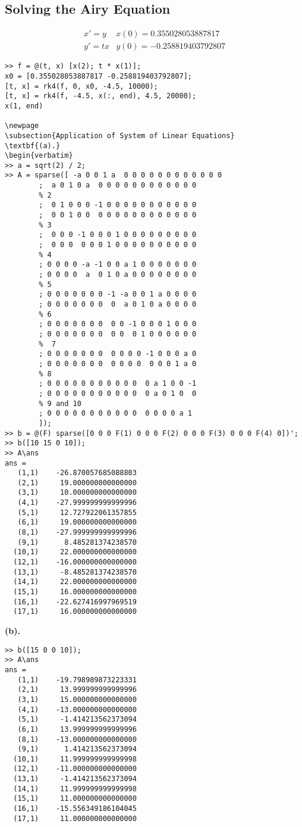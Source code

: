 \subsection{Solving the Airy Equation}
\[\begin{array}{cc}
    x'=y & x(0)=0.355028053887817 \\
    y'=tx & y(0)=-0.258819403792807
\end{array}\]
\begin{verbatim}
>> f = @(t, x) [x(2); t * x(1)];
x0 = [0.355028053887817 -0.258819403792807];
[t, x] = rk4(f, 0, x0, -4.5, 10000);
[t, x] = rk4(f, -4.5, x(:, end), 4.5, 20000);
x(1, end)

\newpage
\subsection{Application of System of Linear Equations}
\textbf{(a).}
\begin{verbatim}
>> a = sqrt(2) / 2;
>> A = sparse([ -a 0 0 1 a  0 0 0 0 0 0 0 0 0 0 0 0
        ;  a 0 1 0 a  0 0 0 0 0 0 0 0 0 0 0 0
        % 2
        ;  0 1 0 0 0 -1 0 0 0 0 0 0 0 0 0 0 0
        ;  0 0 1 0 0  0 0 0 0 0 0 0 0 0 0 0 0
        % 3
        ;  0 0 0 -1 0 0 0 1 0 0 0 0 0 0 0 0 0
        ;  0 0 0  0 0 0 1 0 0 0 0 0 0 0 0 0 0
        % 4
        ; 0 0 0 0 -a -1 0 0 a 1 0 0 0 0 0 0 0
        ; 0 0 0 0  a  0 1 0 a 0 0 0 0 0 0 0 0 
        % 5
        ; 0 0 0 0 0 0 0 -1 -a 0 0 1 a 0 0 0 0
        ; 0 0 0 0 0 0 0  0  a 0 1 0 a 0 0 0 0
        % 6
        ; 0 0 0 0 0 0 0  0 0 -1 0 0 0 1 0 0 0
        ; 0 0 0 0 0 0 0  0 0  0 1 0 0 0 0 0 0
        %  7
        ; 0 0 0 0 0 0 0  0 0 0 0 -1 0 0 0 a 0
        ; 0 0 0 0 0 0 0  0 0 0 0  0 0 0 1 a 0
        % 8
        ; 0 0 0 0 0 0 0 0 0 0 0  0 a 1 0 0 -1
        ; 0 0 0 0 0 0 0 0 0 0 0  0 a 0 1 0  0
        % 9 and 10
        ; 0 0 0 0 0 0 0 0 0 0 0  0 0 0 0 a 1
        ]);
>> b = @(F) sparse([0 0 0 F(1) 0 0 0 F(2) 0 0 0 F(3) 0 0 0 F(4) 0])';
>> b([10 15 0 10]);
>> A\ans
ans =
   (1,1)    -26.870057685088803
   (2,1)     19.000000000000000
   (3,1)     10.000000000000000
   (4,1)    -27.999999999999996
   (5,1)     12.727922061357855
   (6,1)     19.000000000000000
   (8,1)    -27.999999999999996
   (9,1)      8.485281374238570
  (10,1)     22.000000000000000
  (12,1)    -16.000000000000000
  (13,1)     -8.485281374238570
  (14,1)     22.000000000000000
  (15,1)     16.000000000000000
  (16,1)    -22.627416997969519
  (17,1)     16.000000000000000
\end{verbatim}
\textbf{(b).}
\begin{verbatim}
>> b([15 0 0 10]);
>> A\ans
ans =
   (1,1)    -19.798989873223331
   (2,1)     13.999999999999996
   (3,1)     15.000000000000000
   (4,1)    -13.000000000000000
   (5,1)     -1.414213562373094
   (6,1)     13.999999999999996
   (8,1)    -13.000000000000000
   (9,1)      1.414213562373094
  (10,1)     11.999999999999998
  (12,1)    -11.000000000000000
  (13,1)     -1.414213562373094
  (14,1)     11.999999999999998
  (15,1)     11.000000000000000
  (16,1)    -15.556349186104045
  (17,1)     11.000000000000000
\end{verbatim}
